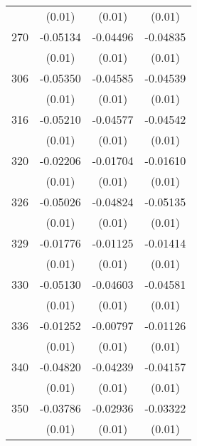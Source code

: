 \begin{table}[htbp]
\begin{tabular}{l*{3}{c}}
                    &      (0.01)         &      (0.01)         &      (0.01)         \\
270                 &    -0.05134\sym{***}&    -0.04496\sym{***}&    -0.04835\sym{***}\\
                    &      (0.01)         &      (0.01)         &      (0.01)         \\
306                 &    -0.05350\sym{***}&    -0.04585\sym{**} &    -0.04539\sym{**} \\
                    &      (0.01)         &      (0.01)         &      (0.01)         \\
316                 &    -0.05210\sym{***}&    -0.04577\sym{***}&    -0.04542\sym{***}\\
                    &      (0.01)         &      (0.01)         &      (0.01)         \\
320                 &    -0.02206         &    -0.01704         &    -0.01610         \\
                    &      (0.01)         &      (0.01)         &      (0.01)         \\
326                 &    -0.05026\sym{***}&    -0.04824\sym{***}&    -0.05135\sym{***}\\
                    &      (0.01)         &      (0.01)         &      (0.01)         \\
329                 &    -0.01776         &    -0.01125         &    -0.01414         \\
                    &      (0.01)         &      (0.01)         &      (0.01)         \\
330                 &    -0.05130\sym{***}&    -0.04603\sym{***}&    -0.04581\sym{***}\\
                    &      (0.01)         &      (0.01)         &      (0.01)         \\
336                 &    -0.01252         &    -0.00797         &    -0.01126         \\
                    &      (0.01)         &      (0.01)         &      (0.01)         \\
340                 &    -0.04820\sym{***}&    -0.04239\sym{***}&    -0.04157\sym{***}\\
                    &      (0.01)         &      (0.01)         &      (0.01)         \\
350                 &    -0.03786\sym{***}&    -0.02936\sym{**} &    -0.03322\sym{**} \\
                    &      (0.01)         &      (0.01)         &      (0.01)         \\

\end{tabular}
\end{table}

